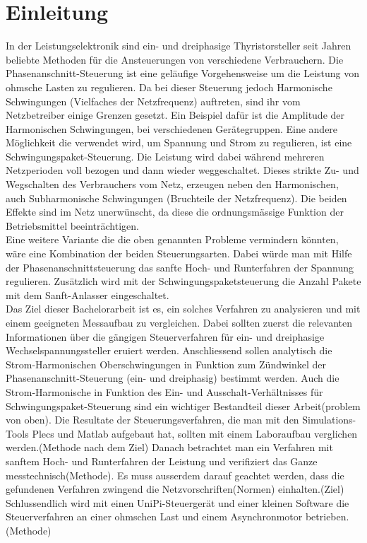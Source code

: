 \section{Einleitung}











In der Leistungselektronik sind ein- und dreiphasige Thyristorsteller seit Jahren beliebte Methoden für die Ansteuerungen von verschiedene Verbrauchern. Die Phasenanschnitt-Steuerung ist eine geläufige Vorgehensweise um die Leistung von ohmsche Lasten zu regulieren. Da bei dieser Steuerung jedoch Harmonische Schwingungen (Vielfaches der Netzfrequenz) auftreten, sind ihr vom Netzbetreiber einige Grenzen gesetzt. Ein Beispiel dafür ist die Amplitude der Harmonischen Schwingungen, bei verschiedenen Gerätegruppen. Eine andere Möglichkeit die verwendet wird, um Spannung und Strom zu regulieren, ist eine Schwingungspaket-Steuerung. Die Leistung wird dabei während mehreren Netzperioden voll bezogen und dann wieder weggeschaltet. Dieses strikte Zu- und Wegschalten des Verbrauchers vom Netz, erzeugen neben den Harmonischen, auch Subharmonische Schwingungen (Bruchteile der Netzfrequenz). Die beiden Effekte sind im Netz unerwünscht, da diese die ordnungsmässige Funktion der Betriebsmittel beeinträchtigen.\\
Eine weitere Variante die die oben genannten Probleme vermindern könnten, wäre eine Kombination der beiden Steuerungsarten. Dabei würde man mit Hilfe der Phasenanschnittsteuerung das sanfte Hoch- und Runterfahren der Spannung regulieren. Zusätzlich wird mit der Schwingungspaketsteuerung die Anzahl Pakete mit dem Sanft-Anlasser eingeschaltet.\\

Das Ziel dieser Bachelorarbeit ist es, ein solches Verfahren zu analysieren und mit einem geeigneten Messaufbau zu vergleichen. Dabei sollten zuerst die relevanten Informationen über die gängigen Steuerverfahren für ein- und dreiphasige Wechselspannungssteller eruiert werden. Anschliessend sollen analytisch die Strom-Harmonischen Oberschwingungen in Funktion zum Zündwinkel der Phasenanschnitt-Steuerung (ein- und dreiphasig) bestimmt werden. Auch die Strom-Harmonische in Funktion des Ein- und Ausschalt-Verhältnisses für Schwingungspaket-Steuerung sind ein wichtiger Bestandteil dieser Arbeit(problem von oben). Die Resultate der Steuerungsverfahren, die man mit den Simulations-Tools Plecs und Matlab aufgebaut hat, sollten mit einem Laboraufbau verglichen werden.(Methode nach dem Ziel) Danach betrachtet man ein Verfahren mit sanftem Hoch- und Runterfahren der Leistung und verifiziert das Ganze messtechnisch(Methode). Es muss ausserdem darauf geachtet werden, dass die gefundenen Verfahren zwingend die Netzvorschriften(Normen) einhalten.(Ziel) Schlussendlich wird mit einen UniPi-Steuergerät und einer kleinen Software die Steuerverfahren an einer ohmschen Last und einem Asynchronmotor betrieben.(Methode)\\


